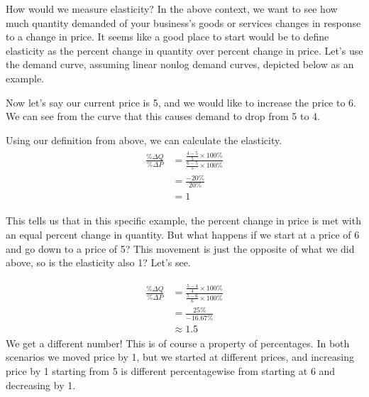 \documentclass[letterpaper,10pt,english]{jupyterBook}
\begin{document}
\sphinxAtStartPar
How would we measure elasticity? In the above context, we want to see how much quantity demanded of your business’s goods or services changes in response to a change in price. It seems like a good place to start would be to define elasticity as the percent change in quantity over percent change in price. Let’s use the demand curve, assuming linear non\sphinxhyphen{}log demand curves, depicted below as an example.

\noindent{}

\sphinxAtStartPar
Now let’s say our current price is 5, and we would like to increase the price to 6. We can see from the curve that this causes demand to drop from 5 to 4.

\noindent{}

\sphinxAtStartPar
Using our definition from above, we can calculate the elasticity.
\begin{equation*}
\begin{split}
\begin{align}
\frac{\%\Delta Q}{\%\Delta P} &= \frac{\frac{4-5}{5}\times100\%}{\frac{6-5}{5}\times100\%} \\
&= \frac{-20\%}{20\%} \\
&= 1
\end{align}
\end{split}
\end{equation*}
\sphinxAtStartPar
{}

\sphinxAtStartPar
This tells us that in this specific example, the percent change in price is met with an equal percent change in quantity. But what happens if we start at a price of 6 and go down to a price of 5? This movement is just the opposite of what we did above, so is the elasticity also 1? Let’s see.

\noindent{}
\begin{equation*}
\begin{split}
\begin{align}
\frac{\%\Delta Q}{\%\Delta P} &= \frac{\frac{5-4}{4}\times100\%}{\frac{5-6}{6}\times100\%} \\
&= \frac{25\%}{-16.67\%} \\
&\approx 1.5
\end{align}
\end{split}
\end{equation*}
\sphinxAtStartPar
We get a different number! This is of course a property of percentages. In both scenarios we moved price by 1, but we started at different prices, and increasing price by 1 starting from 5 is different percentage\sphinxhyphen{}wise from starting at 6 and decreasing by 1.
\end{document}
